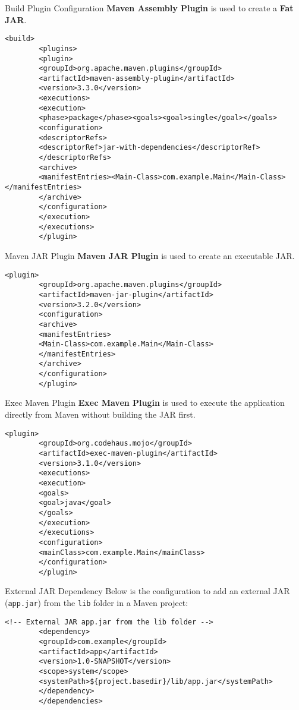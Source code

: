 \documentclass[aspectratio=169, table]{beamer}
\begin{document}
\begin{frame}[fragile]{Build Plugin Configuration}
	\vspace{20pt}
	\textbf{Maven Assembly Plugin} is used to create a \textbf{Fat JAR}.
	\begin{lstlisting}[style=XmlStyle]
		<build>
		<plugins>
		<plugin>
		<groupId>org.apache.maven.plugins</groupId>
		<artifactId>maven-assembly-plugin</artifactId>
		<version>3.3.0</version>
		<executions>
		<execution>
		<phase>package</phase><goals><goal>single</goal></goals>
		<configuration>
		<descriptorRefs>
		<descriptorRef>jar-with-dependencies</descriptorRef>
		</descriptorRefs>
		<archive>
		<manifestEntries><Main-Class>com.example.Main</Main-Class></manifestEntries>
		</archive>
		</configuration>
		</execution>
		</executions>
		</plugin>
	\end{lstlisting}
\end{frame}

\begin{frame}[fragile]{Maven JAR Plugin}
	\textbf{Maven JAR Plugin} is used to create an executable JAR.
	\begin{lstlisting}[style=XmlStyle]
		<plugin>
		<groupId>org.apache.maven.plugins</groupId>
		<artifactId>maven-jar-plugin</artifactId>
		<version>3.2.0</version>
		<configuration>
		<archive>
		<manifestEntries>
		<Main-Class>com.example.Main</Main-Class>
		</manifestEntries>
		</archive>
		</configuration>
		</plugin>
	\end{lstlisting}
\end{frame}

\begin{frame}[fragile]{Exec Maven Plugin}
	\textbf{Exec Maven Plugin} is used to execute the application directly from Maven without building the JAR first.
	\begin{lstlisting}[style=XmlStyle]
		<plugin>
		<groupId>org.codehaus.mojo</groupId>
		<artifactId>exec-maven-plugin</artifactId>
		<version>3.1.0</version>
		<executions>
		<execution>
		<goals>
		<goal>java</goal>
		</goals>
		</execution>
		</executions>
		<configuration>
		<mainClass>com.example.Main</mainClass>
		</configuration>
		</plugin>
	\end{lstlisting}
\end{frame}

\begin{frame}[fragile]{External JAR Dependency}
	Below is the configuration to add an external JAR (\texttt{app.jar}) from the \texttt{lib} folder in a Maven project:
	\begin{lstlisting}[style=XmlStyle]
		<!-- External JAR app.jar from the lib folder -->
		<dependency>
		<groupId>com.example</groupId>
		<artifactId>app</artifactId>
		<version>1.0-SNAPSHOT</version>
		<scope>system</scope>
		<systemPath>${project.basedir}/lib/app.jar</systemPath>
		</dependency>
		</dependencies>
	\end{lstlisting}
\end{frame}
\end{document}
